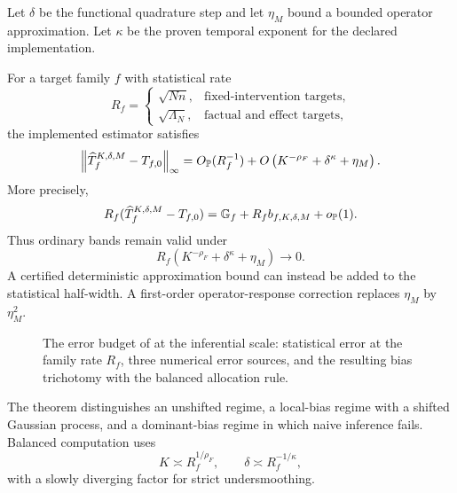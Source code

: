 Let $\delta$ be the functional quadrature step and let $\eta_M$ bound a bounded operator approximation. Let $\kappa$ be the proven temporal exponent for the declared implementation.

\begin{theorem}\label{thm:total-error}
For a target family $f$ with statistical rate
\[
 R_f=
 \begin{cases}
 \sqrt{Nn},&\text{fixed-intervention targets},\\
 \sqrt{\Lambda_N},&\text{factual and effect targets},
 \end{cases}
\]
the implemented estimator satisfies
\[
 \left\lVert\widehat T_f^{K,\delta,M}-T_{f,0}\right\rVert_\infty
 =O_{\mathbb P}(R_f^{-1})
 +O\left(K^{-\rho_F}+\delta^\kappa+\eta_M\right).
\]
More precisely,
\[
 R_f(\widehat T_f^{K,\delta,M}-T_{f,0})
 =\mathbb G_f+R_fb_{f,K,\delta,M}+o_{\mathbb P}(1).
\]
Thus ordinary bands remain valid under
\[
 R_f\left(K^{-\rho_F}+\delta^\kappa+\eta_M\right)\to0.
\]
A certified deterministic approximation bound can instead be added to the statistical half-width. A first-order operator-response correction replaces $\eta_M$ by $\eta_M^2$.
\end{theorem}

\begin{figure}[t]
\centering
\resizebox{.95\textwidth}{!}{}
\caption{The error budget of  at the inferential scale: statistical error at the family rate $R_f$, three numerical error sources, and the resulting bias trichotomy with the balanced allocation rule.}
\label{fig:budget}
\end{figure}

The theorem distinguishes an unshifted regime, a local-bias regime with a shifted Gaussian process, and a dominant-bias regime in which naive inference fails. Balanced computation uses
\[
 K\asymp R_f^{1/\rho_F},
 \qquad
 \delta\asymp R_f^{-1/\kappa},
\]
with a slowly diverging factor for strict undersmoothing.
